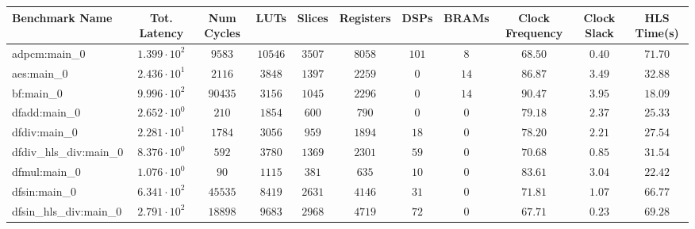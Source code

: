 \begin{tabular}{|l|c|c|c|c|c|c|c|c|c|c|}
\hline
Benchmark Name          & Tot. Latency           & Num Cycles & LUTs      & Slices    & Registers & DSPs    & BRAMs   & Clock Frequency & Clock Slack & HLS Time(s) \\
\hline
adpcm:main\_0           & $ 1.399 \cdot 10^{2} $ & $ 9583   $ & $ 10546 $ & $ 3507  $ & $ 8058  $ & $ 101 $ & $ 8   $ & $ 68.50       $ & $ 0.40    $ & $ 71.70   $ \\
aes:main\_0             & $ 2.436 \cdot 10^{1} $ & $ 2116   $ & $ 3848  $ & $ 1397  $ & $ 2259  $ & $ 0   $ & $ 14  $ & $ 86.87       $ & $ 3.49    $ & $ 32.88   $ \\
bf:main\_0              & $ 9.996 \cdot 10^{2} $ & $ 90435  $ & $ 3156  $ & $ 1045  $ & $ 2296  $ & $ 0   $ & $ 14  $ & $ 90.47       $ & $ 3.95    $ & $ 18.09   $ \\
dfadd:main\_0           & $ 2.652 \cdot 10^{0} $ & $ 210    $ & $ 1854  $ & $ 600   $ & $ 790   $ & $ 0   $ & $ 0   $ & $ 79.18       $ & $ 2.37    $ & $ 25.33   $ \\
dfdiv:main\_0           & $ 2.281 \cdot 10^{1} $ & $ 1784   $ & $ 3056  $ & $ 959   $ & $ 1894  $ & $ 18  $ & $ 0   $ & $ 78.20       $ & $ 2.21    $ & $ 27.54   $ \\
dfdiv\_hls\_div:main\_0 & $ 8.376 \cdot 10^{0} $ & $ 592    $ & $ 3780  $ & $ 1369  $ & $ 2301  $ & $ 59  $ & $ 0   $ & $ 70.68       $ & $ 0.85    $ & $ 31.54   $ \\
dfmul:main\_0           & $ 1.076 \cdot 10^{0} $ & $ 90     $ & $ 1115  $ & $ 381   $ & $ 635   $ & $ 10  $ & $ 0   $ & $ 83.61       $ & $ 3.04    $ & $ 22.42   $ \\
dfsin:main\_0           & $ 6.341 \cdot 10^{2} $ & $ 45535  $ & $ 8419  $ & $ 2631  $ & $ 4146  $ & $ 31  $ & $ 0   $ & $ 71.81       $ & $ 1.07    $ & $ 66.77   $ \\
dfsin\_hls\_div:main\_0 & $ 2.791 \cdot 10^{2} $ & $ 18898  $ & $ 9683  $ & $ 2968  $ & $ 4719  $ & $ 72  $ & $ 0   $ & $ 67.71       $ & $ 0.23    $ & $ 69.28   $ \\

\end{tabular}
